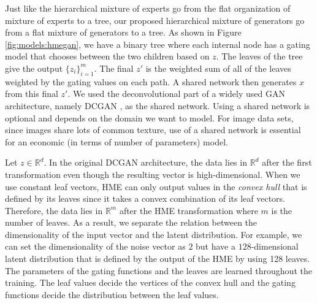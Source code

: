 \documentclass[a4paper,onesided,12pt]{report}
\begin{document}
Just like the hierarchical mixture of experts \cite{jordan1994hierarchical} go from the flat organization of mixture of experts  \cite{jacobs1991adaptive} to a tree, our proposed hierarchical mixture of generators go from a flat mixture of generators to a tree. As shown in Figure \ref{fig:models:hmegan}, we have a binary tree where each internal node has a gating model that chooses between the two children based on $z$. The leaves of the tree give the output $\{z_i\}_{i=1}^m$. The final $z'$ is the weighted sum of all of the leaves weighted by the gating values on each path. A shared network then generates $x$ from this final $z'$.  We used the deconvolutional part of a widely used GAN architecture, namely DCGAN \cite{radford2015unsupervised}, as the shared network. Using a shared network is optional and depends on the domain we want to model. For image data sets, since images share lots of common texture, use of a shared network is essential for an economic (in terms of number of parameters) model.

Let $z \in \mathbb{R}^{d}$. In the original DCGAN architecture, the data lies in $\mathbb{R}^{d}$ after the first transformation even though the resulting vector is high-dimensional. When we use constant leaf vectors, HME can only output values in the \emph{convex hull} that is defined by its leaves since it takes a convex combination of its leaf vectors. Therefore, the data lies in $\mathbb{R}^m$ after the HME transformation where $m$ is the number of leaves. As a result, we separate the relation between the dimensionality of the input vector and the latent distribution. For example, we can set the dimensionality of the noise vector as $2$ but have a $128$-dimensional latent distribution that is defined by the output of the HME by using 128 leaves. The parameters of the gating functions and the leaves are learned throughout the training. The leaf values decide the vertices of the convex hull and the gating functions decide the distribution between the leaf values.
\end{document}
